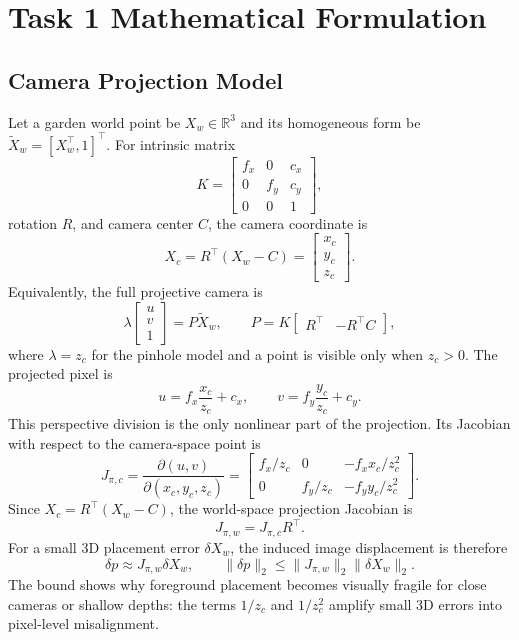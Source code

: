 \documentclass[10pt,twocolumn,letterpaper]{article}
\begin{document}
\FloatBarrier

\section{Task 1 Mathematical Formulation}

\subsection{Camera Projection Model}
Let a garden world point be $X_w\in\mathbb{R}^3$ and its homogeneous form be $\tilde X_w=[X_w^\top,1]^\top$.
For intrinsic matrix
\[
K=\begin{bmatrix} f_x&0&c_x\\0&f_y&c_y\\0&0&1\end{bmatrix},
\]
rotation $R$, and camera center $C$, the camera coordinate is
\[
X_c=R^\top(X_w-C)=\begin{bmatrix}x_c\\y_c\\z_c\end{bmatrix}.
\]
Equivalently, the full projective camera is
\[
\lambda
\begin{bmatrix}u\\v\\1\end{bmatrix}
=
P\tilde X_w,\qquad
P=K\begin{bmatrix}R^\top&-R^\top C\end{bmatrix},
\]
where $\lambda=z_c$ for the pinhole model and a point is visible only when $z_c>0$.
The projected pixel is
\[
u=f_x\frac{x_c}{z_c}+c_x,\qquad
v=f_y\frac{y_c}{z_c}+c_y.
\]
This perspective division is the only nonlinear part of the projection.
Its Jacobian with respect to the camera-space point is
\[
J_{\pi,c}
=
\frac{\partial(u,v)}{\partial(x_c,y_c,z_c)}
=
\begin{bmatrix}
f_x/z_c & 0 & -f_xx_c/z_c^2\\
0 & f_y/z_c & -f_yy_c/z_c^2
\end{bmatrix}.
\]
Since $X_c=R^\top(X_w-C)$, the world-space projection Jacobian is
\[
J_{\pi,w}=J_{\pi,c}R^\top .
\]
For a small 3D placement error $\delta X_w$, the induced image displacement is therefore
\[
\delta p \approx J_{\pi,w}\delta X_w,\qquad
\|\delta p\|_2\le \|J_{\pi,w}\|_2\|\delta X_w\|_2 .
\]
The bound shows why foreground placement becomes visually fragile for close cameras or shallow depths: the terms $1/z_c$ and $1/z_c^2$ amplify small 3D errors into pixel-level misalignment.
\end{document}
